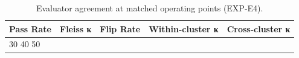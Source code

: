 \begin{table}[htbp]
\centering
\caption{Evaluator agreement at matched operating points (EXP-E4).}
\label{tab:operating_point_matched}
\begin{tabular}{lrrrr}
\toprule
Pass Rate & Fleiss κ & Flip Rate & Within-cluster κ & Cross-cluster κ \\
\midrule
30%
40%
50%
\bottomrule
\end{tabular}
\end{table}
